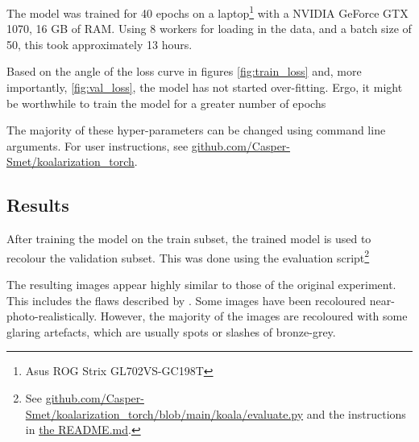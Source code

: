 \documentclass{article}
\begin{document}
        The model was trained for 40 epochs on a laptop\footnote{Asus ROG Strix GL702VS-GC198T} with a NVIDIA GeForce GTX 1070, 16 GB of RAM. Using 8 workers for loading in the data, and a batch size of 50, this took approximately 13 hours.
        
        Based on the angle of the loss curve in figures \ref{fig:train_loss} and, more importantly, \ref{fig:val_loss}, the model has not started over-fitting. Ergo, it might be worthwhile to train the model for a greater number of epochs
        
        The majority of these hyper-parameters can be changed using command line arguments. For user instructions, see \href{https://github.com/Casper-Smet/koalarization\_torch#train}{github.com/Casper-Smet/koalarization\_torch}.
    
    \subsection{Results}
        After training the model on the train subset, the trained model is used to recolour the validation subset. This was done using the evaluation script\footnote{See \href{https://github.com/Casper-Smet/koalarization\_torch/blob/main/koala/evaluate.py}{github.com/Casper-Smet/koalarization\_torch/blob/main/koala/evaluate.py} and the instructions in \href{https://github.com/Casper-Smet/koalarization\_torch}{the README.md}.}
        
        The resulting images appear highly similar to those of the original experiment. This includes the flaws described by \cite{deepkoal2017}. Some images have been recoloured near-photo-realistically. However, the majority of the images are recoloured with some glaring artefacts, which are usually spots or slashes of bronze-grey.
        
        
\end{document}

